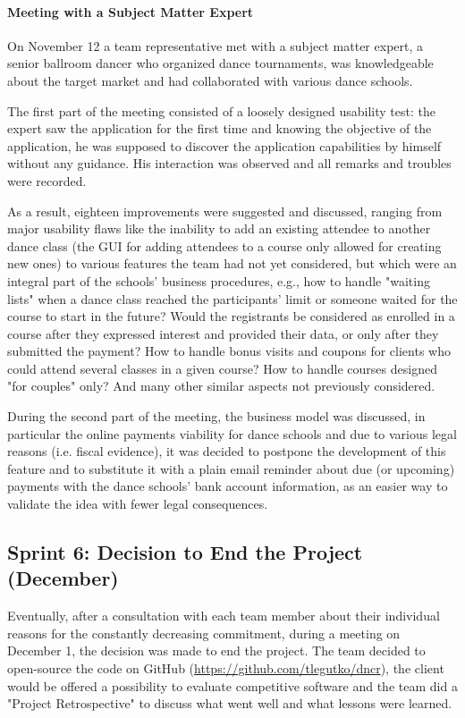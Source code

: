 \documentclass{article}
\begin{document}
\paragraph{Meeting with a Subject Matter Expert}
On November 12 a team representative met with a subject matter expert, a senior ballroom dancer who organized dance tournaments, was knowledgeable about the target market and had collaborated with various dance schools. 

The first part of the meeting consisted of a loosely designed usability test: the expert saw the application for the first time and knowing the objective of the application, he was supposed to discover the application capabilities by himself without any guidance. His interaction was observed and all remarks and troubles were recorded.

As a result, eighteen improvements were suggested and discussed, ranging from major usability flaws like the inability to add an existing attendee to another dance class (the GUI for adding attendees to a course only allowed for creating new ones) to various features the team had not yet considered, but which were an integral part of the schools' business procedures, e.g., how to handle "waiting lists" when a dance class reached the participants' limit or someone waited for the course to start in the future? Would the registrants be considered as enrolled in a course after they expressed interest and provided their data, or only after they submitted the payment? How to handle bonus visits and coupons for clients who could attend several classes in a given course? How to handle courses designed "for couples" only? And many other similar aspects not previously considered.

During the second part of the meeting, the business model was discussed, in particular the online payments viability for dance schools and due to various legal reasons (i.e. fiscal evidence), it was decided to postpone the development of this feature and to substitute it with a plain email reminder about due (or upcoming) payments with the dance schools' bank account information, as an easier way to validate the idea with fewer legal consequences.

\subsection{Sprint 6: Decision to End the Project (December)}
Eventually, after a consultation with each team member about their individual reasons for the constantly decreasing commitment, during a meeting on December 1, the decision was made to end the project. The team decided to open-source the code on GitHub (\url{https://github.com/tlegutko/dncr}), the client would be offered a possibility to evaluate competitive software and the team did a "Project Retrospective" to discuss what went well and what lessons were learned.
\end{document}
